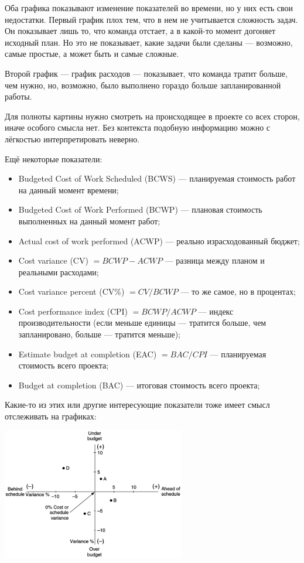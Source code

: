 \documentclass{../../text-style}
\begin{document}
Оба графика показывают изменение показателей во времени, но у них есть свои недостатки. Первый график плох тем, что в нем не учитывается сложность задач. Он показывает лишь то, что команда отстает, а в какой-то момент догоняет исходный план. Но это не показывает, какие задачи были сделаны --- возможно, самые простые, а может быть и самые сложные.

Второй график --- график расходов --- показывает, что команда тратит больше, чем нужно, но, возможно, было выполнено гораздо больше запланированной работы.

Для полноты картины нужно смотреть на происходящее в проекте со всех сторон, иначе особого смысла нет. Без контекста подобную информацию можно с лёгкостью интерпретировать неверно.

Ещё некоторые показатели:

\begin{itemize}
    \item Budgeted Cost of Work Scheduled (BCWS) --- планируемая стоимость работ на данный момент времени;
    \item Budgeted Cost of Work Performed (BCWP) --- плановая стоимость выполненных на данный момент работ;
    \item Actual cost of work performed (ACWP) --- реально израсходованный бюджет;
    \item Cost variance (CV) $= BCWP - ACWP$ --- разница между планом и реальными расходами;
    \item Cost variance percent (CV\%) $= CV / BCWP$ --- то же самое, но в процентах;
    \item Cost performance index (CPI) $= BCWP / ACWP$ --- индекс производительности (если меньше единицы --- тратится больше, чем запланировано, больше --- тратится меньше);
    \item Estimate budget at completion (EAC) $= BAC / CPI$ --- планируемая стоимость всего проекта;
    \item Budget at completion (BAC) --- итоговая стоимость всего проекта;
\end{itemize}

Какие-то из этих или другие интересующие показатели тоже имеет смысл отслеживать на графиках:

\begin{center}
    \includegraphics[width=0.6\textwidth]{varianceGraph.png}
\end{center}
\end{document}
